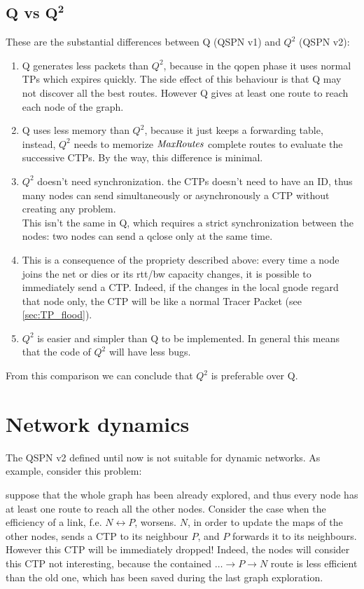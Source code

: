 \documentclass[a4paper]{article}
\begin{document}
\subsection{$\mathbf{Q}$ vs $\mathbf{Q^2}$}
These are the substantial differences between Q (QSPN v1) and $Q^2$ (QSPN v2):
\begin{enumerate}
	\item Q generates less packets than $Q^2$, because in the qopen
		phase it uses normal TPs which expires quickly. The side
		effect of this behaviour is that Q may not discover all
		the best routes. However Q gives at least one route to
		reach each node of the graph.

	\item Q uses less memory than $Q^2$, because it just keeps a
		forwarding table, instead, $Q^2$ needs to memorize 
		$\emph{MaxRoutes}$ complete routes to evaluate the successive
		CTPs. By the way, this difference is minimal.

	\item $Q^2$ doesn't need synchronization. the CTPs doesn't need to
		have an ID, thus many nodes can send simultaneously or
		asynchronously a CTP without creating any problem.\\
		This isn't the same in Q, which requires a strict
		synchronization between the nodes: two nodes can send 
		a qclose only at the same time.
	
	\item This is a consequence of the propriety described above: every
		time a node joins the net or dies or its rtt/bw capacity
		changes, it is possible to immediately send a CTP. Indeed, if
		the changes in the local gnode regard that node only, the CTP
		will be like a normal Tracer Packet (see \ref{sec:TP_flood}).

	\item $Q^2$ is easier and simpler than Q to be implemented. In
		general this means that the code of $Q^2$ will have less
		bugs.
\end{enumerate}

From this comparison we can conclude that $Q^2$ is preferable over Q.

\section{Network dynamics}
\label{sec:netdyn}
The QSPN v2 defined until now is not suitable for dynamic networks. As
example, consider this problem:

suppose that the whole graph has been already explored, and thus every node
has at least one route to reach all the other nodes. Consider the case when
the efficiency of a link, f.e. $N \leftrightarrow P$, worsens.
$N$, in order to update the maps of the other nodes, sends a CTP to its
neighbour $P$, and $P$ forwards it to its neighbours. However this CTP will be
immediately dropped! Indeed, the nodes will consider this CTP not interesting,
because the contained $\dots\rightarrow P \rightarrow N$ route is less
efficient than the old one, which has been saved during the last graph
exploration.
\end{document}
